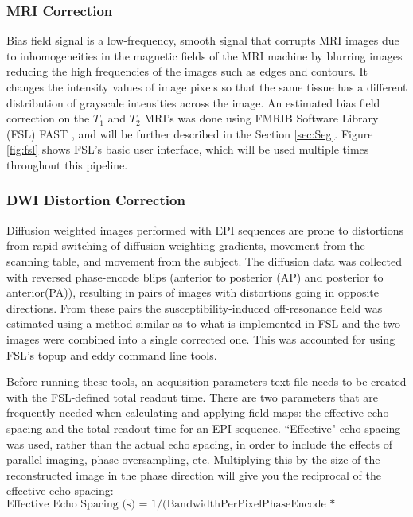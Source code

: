 \subsubsection{MRI Correction}

Bias field signal is a low-frequency, smooth signal that corrupts MRI images due to inhomogeneities in the magnetic fields of the MRI machine by blurring images reducing the high frequencies of the images such as edges and contours. It changes the intensity values of image pixels so that the same tissue has a different distribution of grayscale intensities across the image. \cite{ref:bias} An estimated bias field correction on the $T_1$ and $T_2$ MRI's was done using FMRIB Software Library (FSL) FAST \cite{ref:fslfast}, and will be further described in the Section \ref{sec:Seg}. Figure \ref{fig:fsl} shows FSL's basic user interface, which will be used multiple times throughout this pipeline. 

\subsubsection{DWI Distortion Correction}

Diffusion weighted images performed with EPI sequences are prone to distortions from rapid switching of diffusion weighting gradients, movement from the scanning table, and movement from the subject. The diffusion data was collected with reversed phase-encode blips (anterior to posterior (AP) and posterior to anterior(PA)), resulting in pairs of images with distortions going in opposite directions. From these pairs the susceptibility-induced off-resonance field was estimated using a method \cite{ref:fsltopup1]} similar as to what is implemented in FSL \cite{ref:fsltopup2} and the two images were combined into a single corrected one. This was accounted for using FSL's topup and eddy command line tools.

Before running these tools, an acquisition parameters text file needs to be created with the FSL-defined total readout time. There are two parameters that are frequently needed when calculating and applying field maps: the effective echo spacing and the total readout time for an EPI sequence. ``Effective" echo spacing was used, rather than the actual echo spacing, in order to include the effects of parallel imaging, phase oversampling, etc. Multiplying this by the size of the reconstructed image in the phase direction will give you the reciprocal of the effective echo spacing:
\[
\text{Effective Echo Spacing (s) = 1/(BandwidthPerPixelPhaseEncode * MatrixSizePhase)}
\]

